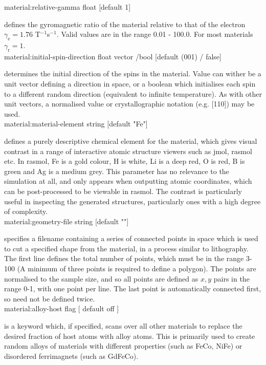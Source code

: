 {\zicf material:relative-gamma float [default 1]} defines the gyromagnetic ratio
of the material relative to that of the electron $\gamma_{\mathrm{e}} = 1.76$ T$^{-1}$s$^{-1}$. Valid values are in the range 0.01 - 100.0. For most materials $\gamma_{\mathrm{r}} = 1$.\\

{\zicf material:initial-spin-direction float vector /bool [default (001) / false]} determines the initial direction of the spins in the material. Value can wither be a unit vector defining a direction in space, or a boolean which initialises each spin to a different random direction (equivalent to infinite temperature). As with other unit vectors, a  normalised value or crystallographic notation (e.g. [110]) may be used.\\

{\zicf material:material-element string [default "Fe"]} defines a purely descriptive chemical element for the material, which gives visual contrast in a range of interactive atomic structure viewers such as jmol, rasmol etc. In rasmol, Fe is a gold colour, H is white, Li is a deep red, O is red, B is green and Ag is a medium grey. This parameter has no relevance to the simulation at all, and only appears when outputting atomic coordinates, which can be post-processed to be viewable in rasmol. The contrast is particularly useful in inspecting the generated structures, particularly ones with a high degree of complexity.\\

{\zicf material:geometry-file string [default ""]} specifies a filename containing a series of connected points in space which is used to cut a specified shape from the material, in a process similar to lithography. The first line defines the total number of points, which must be in the range 3-100 (A minimum of three points is required to define a polygon). The points are normalised to the sample size, and so all points are defined as $x,y$ pairs in the range 0-1, with one point per line. The last point is automatically connected first, so need not be defined twice.\\

{\zicf material:alloy-host flag [ default off ]} is a keyword which, if specified, scans over all other materials to replace the desired fraction of host atoms with alloy atoms. This is primarily used to create random alloys of materials with different properties (such as FeCo, NiFe) or disordered ferrimagnets (such as GdFeCo).\\

